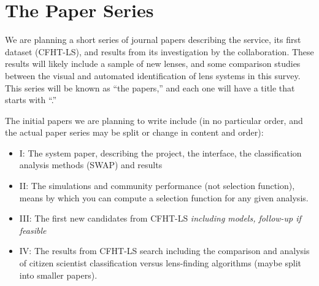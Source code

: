 \documentclass[a4paper]{article}
\begin{document}




\section{The \SW Paper Series}
\label{sec:series}

We are planning a short series of journal papers describing the \sw service, its
first dataset (CFHT-LS), and results from its investigation by the
collaboration. These results will likely include a sample of new lenses,
and some comparison studies between the visual and automated
identification of lens systems in this survey. This series will be known
as ``the \sw papers,'' and each one will have a title that starts with ``\sw.''

The initial papers we are planning to write include (in no particular order, and the actual paper series may be split or change in content and order):

\begin{itemize}
\item \sw I: The system paper, describing the project, the interface, the classification analysis methods (SWAP) and results 
\item \sw II: The \sw  simulations and community performance (not selection function), means by which you can compute a selection function for any given analysis. 
\item \sw III: The first new candidates from CFHT-LS \textit{including models, follow-up if feasible}
\item \sw IV: The results from CFHT-LS search including the comparison and analysis of citizen scientist classification versus lens-finding algorithms (maybe split into smaller papers).
\end{itemize}
\end{document}
